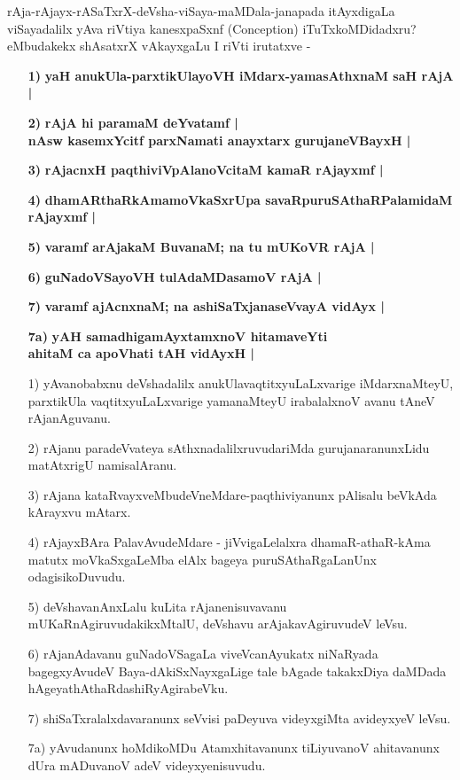 \noindent
rAja-rAjayx-rASaTxrX-deVsha-viSaya-maMDala-janapada itAyxdigaLa viSayadalilx yAva riVtiya kanesx\-paSxnf ({\rm Conception}) iTuTxkoMDidadxru? eMbudakekx shAsatxrX vAkayxgaLu I riVti irutatxve -

\begin{itemize}
\item [\bf 1)] {\bf yaH anukUla-parxtikUlayoVH iMdarx-yamasAthxnaM saH rAjA |}\label{94}
\item [\bf 2)] {\bf rAjA hi paramaM deYvatamf |\\\label{93} nAsw kasemxYcitf parxNamati anayxtarx gurujaneVBayxH |}
\item [\bf 3)] {\bf rAjacnxH paqthiviVpAlanoVcitaM kamaR rAjayxmf |}\label{94}
\item [\bf 4)] {\bf dhamARthaRkAmamoVkaSxrUpa savaRpuruSAthaRPalamidaM rAjayxmf |}\label{94}
\item [\bf 5)] {\bf varamf arAjakaM BuvanaM; na tu mUKoVR rAjA |}\label{94}
\item [\bf 6)] {\bf guNadoVSayoVH tulAdaMDasamoV rAjA |}\label{94}
\item [\bf 7)] {\bf varamf ajAcnxnaM; na ashiSaTxjanaseVvayA vidAyx |}\label{94}
\item [\bf 7a)] {\bf yAH samadhigamAyxtamxnoV hitamaveYti}\\ {\bf ahitaM ca apoVhati tAH vidAyxH |}\label{94}

\item [1)] yAvanobabxnu deVshadalilx anukUlavaqtitxyuLaLxvarige iMdarxnaMteyU, parxtikUla vaqtitxyuLaLxva\-rige yamanaMteyU irabalalxnoV avanu tAneV rAjanAguvanu.
\item [2)] rAjanu paradeVvateya sAthxnadalilxruvudariMda gurujanaranunxLidu matAtxrigU namisalAranu.
\item [3)] rAjana kataRvayxveMbudeVneMdare-paqthiviyanunx pAlisalu beVkAda kArayxvu mAtarx.
\item [4)] rAjayxBAra PalavAvudeMdare - jiVvigaLelalxra dhamaR-athaR-kAma matutx moVkaSxgaLeMba elAlx\- bageya puruSAthaRgaLanUnx odagisikoDuvudu.
\item [5)] deVshavanAnxLalu kuLita rAjanenisuvavanu mUKaRnAgiruvudakikxMtalU, deVshavu arAjakavAgiru\-vudeV leVsu.
\item [6)] rAjanAdavanu guNadoVSagaLa viveVcanAyukatx niNaRyada bagegx\break yAvudeV Baya-dAkiSxNayx\-gaLige tale bAgade takakxDiya daMDada hAge\break yathAthaRdashiR\-yAgirabeVku.
\item [7)] shiSaTxralalxdavaranunx seVvisi paDeyuva videyxgiMta avideyxyeV leVsu.
\item [7a)] yAvudanunx hoMdikoMDu Atamxhitavanunx tiLiyuvanoV ahitavanunx dUra mADu\-vanoV adeV videyxyenisuvudu.


\end{itemize}

